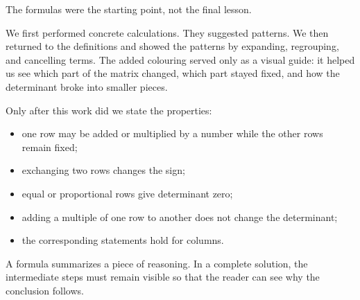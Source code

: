 \begin{summarybox}
The formulas were the starting point, not the final lesson.

We first performed concrete calculations. They suggested patterns. We then returned to the definitions and showed the patterns by expanding, regrouping, and cancelling terms. The added colouring served only as a visual guide: it helped us see which part of the matrix changed, which part stayed fixed, and how the determinant broke into smaller pieces.

Only after this work did we state the properties:
\begin{itemize}
\item one row may be added or multiplied by a number while the other rows remain fixed;
\item exchanging two rows changes the sign;
\item equal or proportional rows give determinant zero;
\item adding a multiple of one row to another does not change the determinant;
\item the corresponding statements hold for columns.
\end{itemize}

A formula summarizes a piece of reasoning. In a complete solution, the intermediate steps must remain visible so that the reader can see why the conclusion follows.
\end{summarybox}
